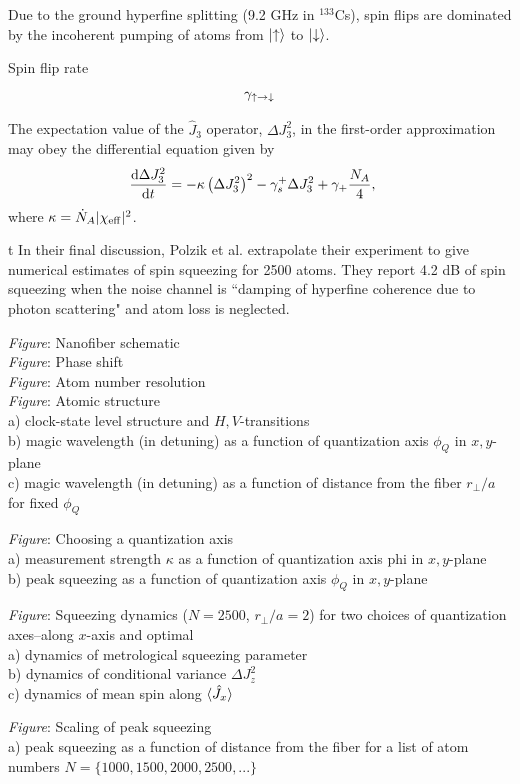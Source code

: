 \documentclass[preprint,aps,pra,onecolumn]{revtex4-1} %
\newcommand{\change}[1]{{\color{RoyalBlue} #1}}
\newcommand{\comment}[1]{{\color{Maroon} #1}}
\begin{document}
Due to the ground hyperfine splitting (9.2 GHz in $^{133}$Cs), spin flips are dominated by the incoherent pumping of atoms from $\lvert{\uparrow}\rangle$ to $\lvert{\downarrow}\rangle$. 

\change{	

Spin flip rate
	\begin{align}
		\gamma_{\rm \uparrow \rightarrow \downarrow}
	\end{align}
	
The expectation value of the $ \hat{J}_3 $ operator, $ \Delta J_3^2 $, in the first-order approximation may obey the differential equation given by 
\begin{align}
\frac{{\mathrm d} {\Delta J_3^2}}{{\mathrm d}t} &= -\kappa \left(\Delta J_3^2 \right)^2 -\gamma_s^+ \Delta J_3^2 + \gamma_+\frac{N_A}{4},
\end{align}
where $ \kappa=\dot{N}_A |\chi_{\rm eff}|^2$. 

}t
\comment{ In their final discussion, Polzik et al. \cite{beguin_generation_2014} extrapolate their experiment to give numerical estimates of spin squeezing for 2500 atoms.  They report 4.2 dB of spin squeezing when the noise channel is ``damping of hyperfine coherence due to photon scattering" and atom loss is neglected. }

\comment{
\emph{Figure}: Nanofiber schematic \\

\emph{Figure}: Phase shift \\

\emph{Figure}: Atom number resolution \\

\emph{Figure}: Atomic structure \\
a) clock-state level structure and $H,V$-transitions \\
b) magic wavelength (in detuning) as a function of quantization axis $\phi_Q$ in $x,y$-plane \\
c) magic wavelength (in detuning) as a function of distance from the fiber $r_\perp/a$ for fixed $\phi_Q$ 

\emph{Figure}: Choosing a quantization axis\\
a) measurement strength $\kappa$ as a function of quantization axis phi in $x,y$-plane\\
b) peak squeezing as a function of quantization axis $\phi_Q$ in $x,y$-plane

\emph{Figure}:  Squeezing dynamics ($N=2500$, $r_\perp/a = 2$) for two choices of quantization axes--along $x$-axis and optimal\\
a) dynamics of metrological squeezing parameter \\
b) dynamics of conditional variance $\Delta J_z^2$ \\
c) dynamics of mean spin along $\langle{\hat{J}_x}\rangle$

\emph{Figure}:  Scaling of peak squeezing\\
a) peak squeezing as a function of distance from the fiber for a list of atom numbers $N= \{1000,1500,2000,2500,...\}$
}
\end{document}
